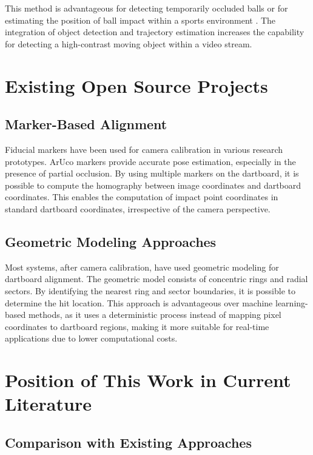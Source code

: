 This method is advantageous for detecting temporarily occluded balls or for estimating the position of ball impact within a sports environment \cite{Osadchy2006}. The integration of object detection and trajectory estimation increases the capability for detecting a high-contrast moving object within a video stream.

\section{Existing Open Source Projects}

\subsection{Marker-Based Alignment}

Fiducial markers have been used for camera calibration in various research prototypes. ArUco markers provide accurate pose estimation, especially in the presence of partial occlusion. By using multiple markers on the dartboard, it is possible to compute the homography between image coordinates and dartboard coordinates. This enables the computation of impact point coordinates in standard dartboard coordinates, irrespective of the camera perspective.

\subsection{Geometric Modeling Approaches}

Most systems, after camera calibration, have used geometric modeling for dartboard alignment. The geometric model consists of concentric rings and radial sectors. By identifying the nearest ring and sector boundaries, it is possible to determine the hit location. This approach is advantageous over machine learning-based methods, as it uses a deterministic process instead of mapping pixel coordinates to dartboard regions, making it more suitable for real-time applications due to lower computational costs.

\section{Position of This Work in Current Literature}

\subsection{Comparison with Existing Approaches}

